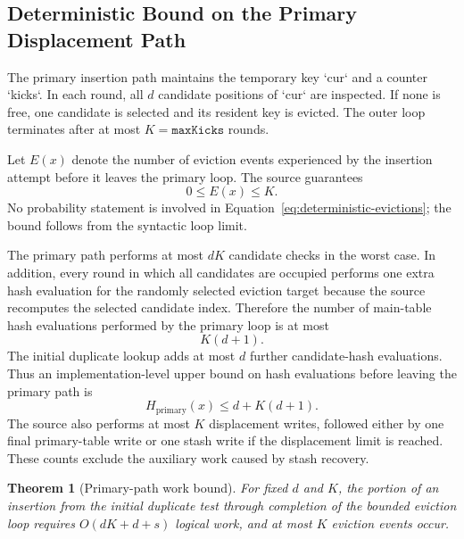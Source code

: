 \documentclass[conference]{IEEEtran}
\newtheorem{theorem}{Theorem}
\begin{document}
\subsection{Deterministic Bound on the Primary Displacement Path}

The primary insertion path maintains the temporary key `cur` and a counter `kicks`. In each round, all $d$ candidate positions of `cur` are inspected. If none is free, one candidate is selected and its resident key is evicted. The outer loop terminates after at most $K=\texttt{maxKicks}$ rounds.

Let $E(x)$ denote the number of eviction events experienced by the insertion attempt before it leaves the primary loop. The source guarantees
\begin{equation}
    0\le E(x)\le K.
    \label{eq:deterministic-evictions}
\end{equation}
No probability statement is involved in Equation~\eqref{eq:deterministic-evictions}; the bound follows from the syntactic loop limit.

The primary path performs at most $dK$ candidate checks in the worst case. In addition, every round in which all candidates are occupied performs one extra hash evaluation for the randomly selected eviction target because the source recomputes the selected candidate index. Therefore the number of main-table hash evaluations performed by the primary loop is at most
\begin{equation}
    K(d+1).
    \label{eq:hash-eval-primary}
\end{equation}
The initial duplicate lookup adds at most $d$ further candidate-hash evaluations. Thus an implementation-level upper bound on hash evaluations before leaving the primary path is
\begin{equation}
    H_{\mathrm{primary}}(x) \le d+K(d+1).
    \label{eq:hash-eval-total-primary}
\end{equation}
The source also performs at most $K$ displacement writes, followed either by one final primary-table write or one stash write if the displacement limit is reached. These counts exclude the auxiliary work caused by stash recovery.

\begin{theorem}[Primary-path work bound]
For fixed $d$ and $K$, the portion of an insertion from the initial duplicate test through completion of the bounded eviction loop requires $O(dK+d+s)$ logical work, and at most $K$ eviction events occur.
\end{theorem}
\end{document}
